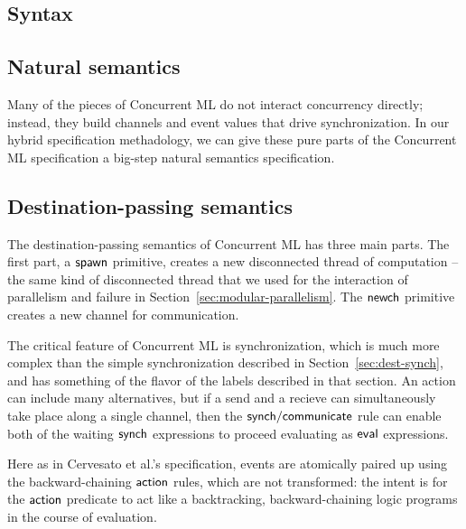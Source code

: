 \subsection{Syntax}


\subsection{Natural semantics}

Many of the pieces of Concurrent ML do not interact concurrency
directly; instead, they build channels and event values that drive
synchronization. In our hybrid specification methadology, we can give
these pure parts of the Concurrent ML specification a big-step
natural semantics specification.

\bigskip
{}

\subsection{Destination-passing semantics}

The destination-passing semantics of Concurrent ML has three main
parts.  The first part, a ${\sf spawn}$ primitive, creates a new
disconnected thread of computation -- the same kind of disconnected
thread that we used for the interaction of parallelism and failure in
Section~\ref{sec:modular-parallelism}. The ${\sf newch}$ primitive 
creates a new channel for communication.

\bigskip
{}
\bigskip

\noindent
The critical feature of Concurrent ML is synchronization, which is
much more complex than the simple synchronization described in
Section~\ref{sec:dest-synch}, and has something of the flavor of the
labels described in that section. An action can include many
alternatives, but if a send and a recieve can simultaneously take
place along a single channel, then the ${\sf synch/communicate}$ rule
can enable both of the waiting ${\sf synch}$ expressions to proceed
evaluating as ${\sf eval}$ expressions.

Here as in Cervesato et al.'s specification, events are atomically
paired up using the backward-chaining ${\sf action}$ rules, which are
not transformed: the intent is for the ${\sf action}$ predicate to act 
like a backtracking, backward-chaining logic programs in the course
of evaluation.

